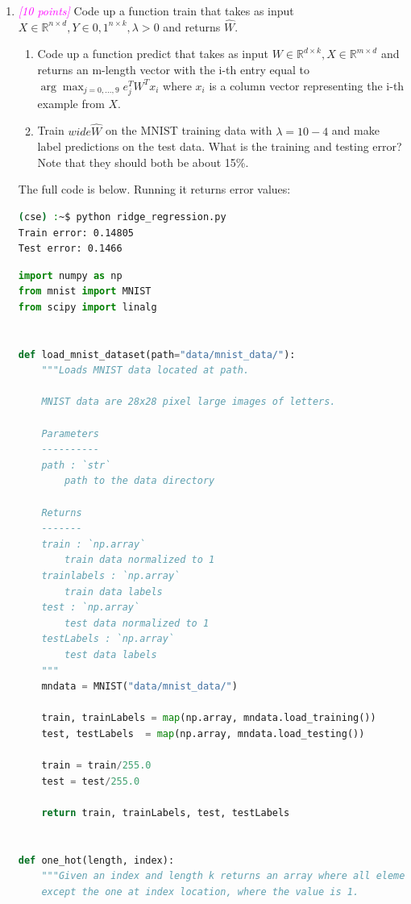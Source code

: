 \documentclass{article}
\newcommand{\argmax}{\arg\!\max}
\newcommand{\field}[1]{\mathbb{#1}}
\newcommand{\1}{\mathbf{1}}
\newcommand{\R}{\field{R}} %
\newcommand{\points}[1]{\small\textcolor{magenta}{\emph{[#1 points]}} \normalsize}
\begin{document}
\begin{enumerate}
    
    \item \points{10} Code up a function train that takes as input $X\in\R^{n\times d},Y\in {0,1}^{n\times k},\lambda>0$ and returns $\hat W$.
    \begin{enumerate}
        \item Code up a function predict that takes as input $W\in\R^{d\times k},X\in\R^{m\times d}$ and returns an m-length vector with the i-th entry equal to $\argmax_{j=0,...,9}e^T_jW^Tx_i$ where $x_i$ is a column vector representing the i-th example from $X$.
        \item Train $wide\hat W$ on the MNIST training data with $\lambda = 10-4$ and make label predictions on the test data. What is the training and testing error? Note that they should both be about 15\%.
    \end{enumerate}
    The full code is below. Running it returns error values:
    
\begin{lstlisting}[language=Bash]
(cse) :~$ python ridge_regression.py 
Train error: 0.14805
Test error: 0.1466
\end{lstlisting}

\begin{lstlisting}[language=Python]
import numpy as np
from mnist import MNIST
from scipy import linalg


def load_mnist_dataset(path="data/mnist_data/"):
    """Loads MNIST data located at path.

    MNIST data are 28x28 pixel large images of letters.

    Parameters
    ----------
    path : `str`
        path to the data directory

    Returns
    -------
    train : `np.array`
        train data normalized to 1
    trainlabels : `np.array`
        train data labels
    test : `np.array`
        test data normalized to 1
    testLabels : `np.array`
        test data labels    
    """
    mndata = MNIST("data/mnist_data/")

    train, trainLabels = map(np.array, mndata.load_training())
    test, testLabels  = map(np.array, mndata.load_testing())

    train = train/255.0
    test = test/255.0

    return train, trainLabels, test, testLabels


def one_hot(length, index):
    """Given an index and length k returns an array where all elements are zero
    except the one at index location, where the value is 1.


\end{lstlisting}
\end{enumerate}
\end{document}
